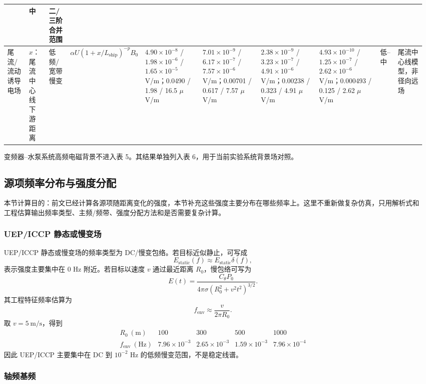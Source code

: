 \begin{table}[H]
{\begin{tabular}{p{2.4cm}p{2.2cm}p{2.0cm}p{2.4cm}p{3.2cm}p{3.2cm}p{3.2cm}p{3.2cm}p{2.0cm}p{2.5cm}}
& 中
& 二/三阶合并范围\\
\midrule
尾流/流动诱导电场
& $x$：尾流中心线下游距离
& 低频/宽带慢变
& $\alpha U(1+x/L_{\mathrm{ship}})^{-p}B_0$
& $4.90\times10^{-8}$ / $1.98\times10^{-6}$ / $1.65\times10^{-5}$ V/m；0.0490 / 1.98 / 16.5 $\mu$V/m
& $7.01\times10^{-9}$ / $6.17\times10^{-7}$ / $7.57\times10^{-6}$ V/m；0.00701 / 0.617 / 7.57 $\mu$V/m
& $2.38\times10^{-9}$ / $3.23\times10^{-7}$ / $4.91\times10^{-6}$ V/m；0.00238 / 0.323 / 4.91 $\mu$V/m
& $4.93\times10^{-10}$ / $1.25\times10^{-7}$ / $2.62\times10^{-6}$ V/m；0.000493 / 0.125 / 2.62 $\mu$V/m
& 低--中
& 尾流中心线模型，非径向远场\\
\bottomrule
\end{tabular}}
\end{table}

变频器--水泵系统高频电磁背景不进入表 5。其结果单独列入表 6，用于当前实验系统背景场对照。

\subsection{源项频率分布与强度分配}

本节计算目的：前文已经计算各源项随距离变化的强度，本节补充这些强度主要分布在哪些频率上。这里不重新做复杂仿真，只用解析式和工程估算输出频率类型、主频/频带、强度分配方法和是否需要复杂计算。

\subsubsection*{UEP/ICCP 静态或慢变场}

UEP/ICCP 静态或慢变场的频率类型为 DC/慢变包络。若目标近似静止，可写成
\[
E_{\mathrm{static}}(f)\approx E_{\mathrm{static}}\delta(f),
\]
表示强度主要集中在 0 Hz 附近。若目标以速度 $v$ 通过最近距离 $R_0$，慢包络可写为
\[
E(t)=\frac{C_\theta P_0}{4\pi\sigma\left(R_0^2+v^2t^2\right)^{3/2}}.
\]
其工程特征频率估算为
\[
f_{\mathrm{env}}\approx\frac{v}{2\pi R_0}.
\]
取 $v=5\ \mathrm{m/s}$，得到
\[
\begin{array}{c|cccc}
R_0\ (\mathrm{m}) & 100 & 300 & 500 & 1000\\
\hline
f_{\mathrm{env}}\ (\mathrm{Hz}) & 7.96\times10^{-3} & 2.65\times10^{-3} & 1.59\times10^{-3} & 7.96\times10^{-4}
\end{array}
\]
因此 UEP/ICCP 主要集中在 DC 到 $10^{-2}$ Hz 的低频慢变范围，不是稳定线谱。

\subsubsection*{轴频基频}

